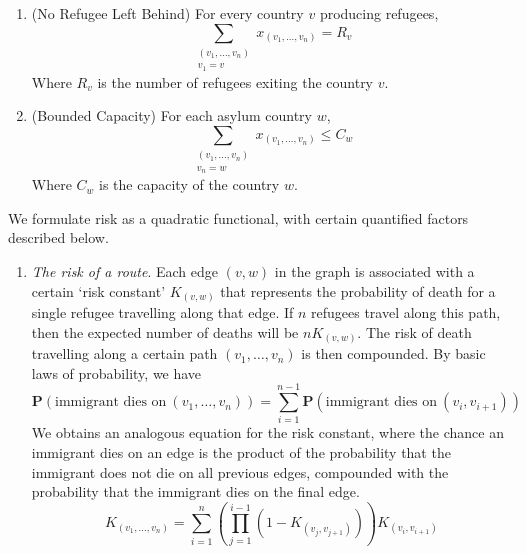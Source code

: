 \documentclass{article}
\begin{document}
\begin{enumerate}
\begin{enumerate}
    \item (No Refugee Left Behind) For every country $v$ producing refugees,
    \[ \sum_{\substack{(v_1, \dots, v_n) \\ v_1 = v}} x_{(v_1, \dots, v_n)} = R_v \]
    Where $R_v$ is the number of refugees exiting the country $v$.

    \item (Bounded Capacity) For each asylum country $w$,
    \[ \sum_{\substack{(v_1, \dots, v_n) \\ v_n = w}} x_{(v_1, \dots, v_n)} \leq C_w \]
    Where $C_w$ is the capacity of the country $w$.
\end{enumerate}

We formulate risk as a quadratic functional, with certain quantified factors described below.

\begin{enumerate}
    \item {\it The risk of a route}. Each edge $(v,w)$ in the graph is associated with a certain `risk constant' $K_{(v,w)}$ that represents the probability of death for a single refugee travelling along that edge. If $n$ refugees travel along this path, then the expected number of deaths will be $n K_{(v,w)}$. The risk of death travelling along a certain path $(v_1, \dots, v_n)$ is then compounded. By basic laws of probability, we have
    \[ \mathbf{P}(\text{immigrant dies on}\ (v_1, \dots, v_n)) = \sum_{i = 1}^{n-1} \mathbf{P}(\text{immigrant dies on}\ (v_i, v_{i+1})) \]
    We obtains an analogous equation for the risk constant, where the chance an immigrant dies on an edge is the product of the probability that the immigrant does not die on all previous edges, compounded with the probability that the immigrant dies on the final edge.
    \[ K_{(v_1, \dots, v_n)} = \sum_{i = 1}^n \left( \prod_{j = 1}^{i-1} \left(1 - K_{(v_j,v_{j+1})} \right) \right) K_{(v_i, v_{i+1})} \]


\end{enumerate}
\end{enumerate}
\end{document}
